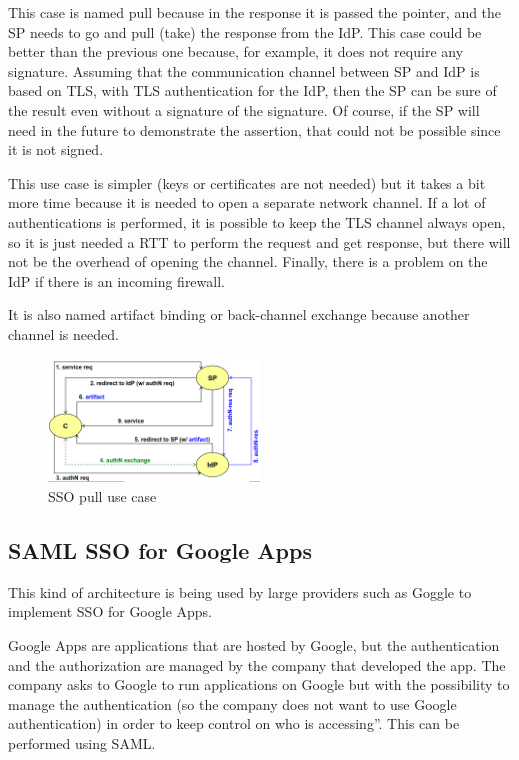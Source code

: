 This case is named pull because in the response it is passed the
pointer, and the SP needs to go and pull (take) the response from the
IdP. This case could be better than the previous one because, for
example, it does not require any signature. Assuming that the
communication channel between SP and IdP is based on TLS, with TLS
authentication for the IdP, then the SP can be sure of the result even
without a signature of the signature. Of course, if the SP will need
in the future to demonstrate the assertion, that could not be possible
since it is not signed.

This use case is simpler (keys or certificates are not needed) but it
takes a bit more time because it is needed to open a separate network
channel. If a lot of authentications is performed, it is possible to
keep the TLS channel always open, so it is just needed a RTT to
perform the request and get response, but there will not be the
overhead of opening the channel. Finally, there is a problem on the
IdP if there is an incoming firewall. 

It is also named artifact binding or back-channel exchange because
another channel is needed. 

\begin{figure}[H]
  \centering
  \includegraphics[width=0.5\textwidth]{img/sso pull use case.png}
  \caption{SSO pull use case}
\end{figure}

\subsection{SAML SSO for Google Apps}
This kind of architecture is being used by large providers such as
Goggle to implement SSO for Google Apps.

Google Apps are applications that are hosted by Google, but the
authentication and the authorization are managed by the company that
developed the app. The company asks to Google to run applications on
Google but with the possibility to manage the authentication (so the
company does not want to use Google authentication) in order to keep
control on who is accessing”. This can be performed using SAML.

